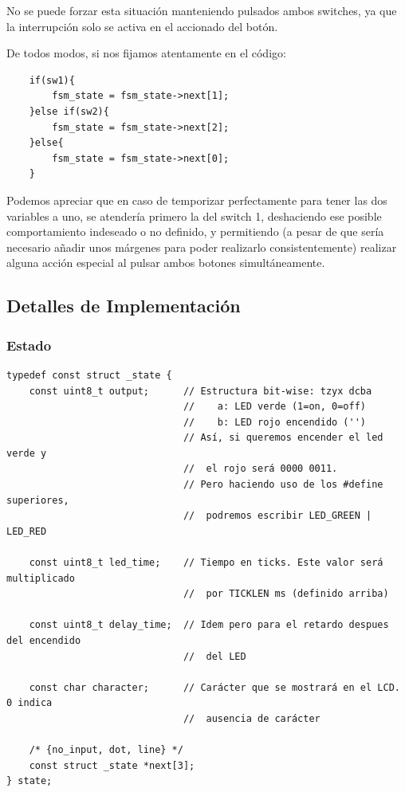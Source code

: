 \documentclass[a4paper,openright,12pt]{article}
\begin{document}
No se puede forzar esta situación manteniendo pulsados ambos switches, ya que la interrupción solo se activa en el accionado del botón.

De todos modos, si nos fijamos atentamente en el código:

\begin{samepage}
\begin{verbatim}
    if(sw1){
        fsm_state = fsm_state->next[1];
    }else if(sw2){
        fsm_state = fsm_state->next[2];
    }else{
        fsm_state = fsm_state->next[0];
    }
\end{verbatim}    
\end{samepage}

Podemos apreciar que en caso de temporizar perfectamente para tener las dos variables a uno, se atendería primero la del switch 1, deshaciendo ese posible comportamiento
indeseado o no definido, y permitiendo (a pesar de que sería necesario añadir unos márgenes para poder realizarlo consistentemente) realizar alguna acción especial al pulsar ambos
botones simultáneamente.

\subsection{Detalles de Implementación}
\subsubsection{Estado}
\begin{samepage}    
\begin{verbatim}
typedef const struct _state {
    const uint8_t output;      // Estructura bit-wise: tzyx dcba
                               //    a: LED verde (1=on, 0=off)
                               //    b: LED rojo encendido ('')
                               // Así, si queremos encender el led verde y
                               //  el rojo será 0000 0011.
                               // Pero haciendo uso de los #define superiores,
                               //  podremos escribir LED_GREEN | LED_RED 

    const uint8_t led_time;    // Tiempo en ticks. Este valor será multiplicado
                               //  por TICKLEN ms (definido arriba)

    const uint8_t delay_time;  // Idem pero para el retardo despues del encendido
                               //  del LED
    
    const char character;      // Carácter que se mostrará en el LCD. 0 indica
                               //  ausencia de carácter
    
    /* {no_input, dot, line} */
    const struct _state *next[3];
} state;
\end{verbatim}
\end{samepage}
\end{document}
